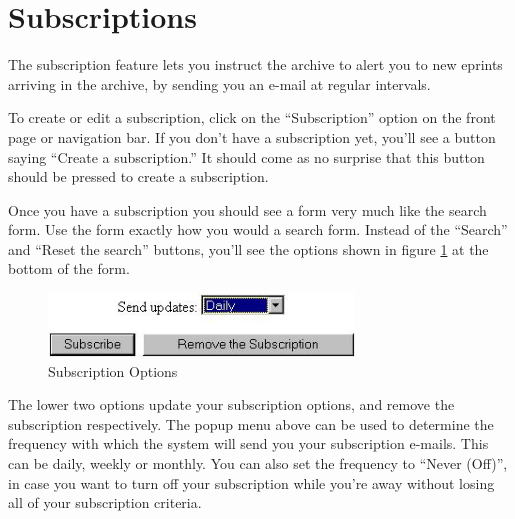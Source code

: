 \section{Subscriptions}


The subscription feature lets you instruct the archive to alert you to new eprints arriving in the archive, by sending you an e-mail at regular intervals.

To create or edit a subscription, click on the ``Subscription'' option on the front page or navigation bar. If you don't have a subscription yet, you'll see a button saying ``Create a subscription.'' It should come as no surprise that this button should be pressed to create a subscription.

Once you have a subscription you should see a form very much like the search form. Use the form exactly how you would a search form. Instead of the ``Search'' and ``Reset the search'' buttons, you'll see the options shown in figure \ref{subscription_options} at the bottom of the form.

\begin{figure}
\centerline{\includegraphics[width=3.2in]{images/subscription-options}}
\caption{\label{subscription_options} Subscription Options}
\end{figure}

The lower two options update your subscription options, and remove the subscription respectively. The popup menu above can be used to determine the frequency with which the system will send you your subscription e-mails. This can be daily, weekly or monthly. You can also set the frequency to ``Never (Off)'',  in case you want to turn off your subscription while you're away without losing all of your subscription criteria.
